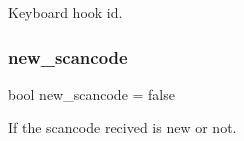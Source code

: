 Keyboard hook id. 

\mbox{\label{group__keyboard_ga96f7c2f0fe863bd78294a8f639e60478}} 
\subsubsection{\texorpdfstring{new\+\_\+scancode}{new\_scancode}}
{\footnotesize\ttfamily bool new\+\_\+scancode = false}



If the scancode recived is new or not. 

